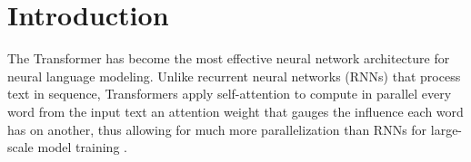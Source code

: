\section{Introduction}
The Transformer has become the most effective neural network architecture for neural language modeling. 
Unlike recurrent neural networks (RNNs) that process text in sequence, Transformers apply self-attention to compute in parallel every word from the input text an attention weight that gauges the influence each word has on another, thus allowing for much more parallelization than RNNs for large-scale model training \citep{vaswani2017attention}. 
